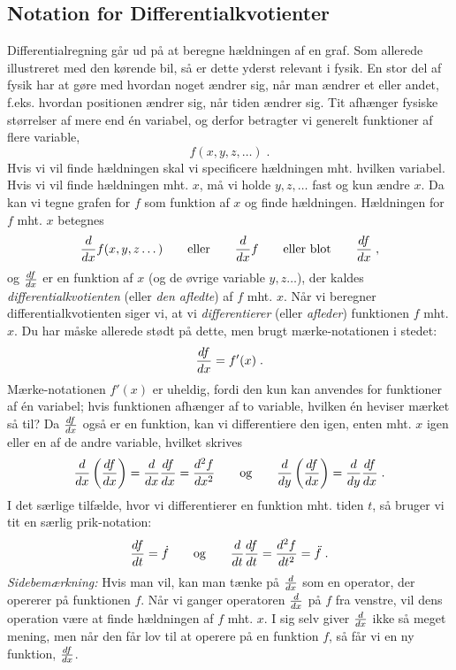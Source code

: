 \subsection{Notation for Differentialkvotienter}
Differentialregning går ud på at beregne hældningen af en graf. Som
allerede illustreret med den kørende bil, så er dette yderst relevant
i fysik. En stor del af fysik har at gøre med hvordan noget ændrer
sig, når man ændrer et eller andet, f.eks. hvordan positionen ændrer
sig, når tiden ændrer sig. Tit afhænger fysiske størrelser af mere end
én variabel, og derfor betragter vi generelt funktioner af flere
variable,
\[
f(x,y,z,\dots) \; .
\]
Hvis vi vil finde hældningen skal vi specificere hældningen
mht. hvilken variabel. Hvis vi vil finde hældningen mht. $x$, må vi
holde $y, z, \dots$ fast og kun ændre $x$. Da kan vi tegne grafen for
$f$ som funktion af $x$ og finde hældningen. Hældningen for $f$
mht. $x$ betegnes
\begin{align*}
  \dl{f(x,y,z\dots)}{x}
  \qquad
  \text{eller}
  \qquad
  \dl{f}{x}
  \qquad
  \text{eller blot}
  \qquad
  \d{f}{x} \; ,
\end{align*}
og $\d{f}{x}$ er en funktion af $x$ (og de øvrige variable
$y,z\dots$), der kaldes \emph{differentialkvotienten} (eller \emph{den
  afledte}) af $f$ mht. $x$. Når vi beregner differentialkvotienten
siger vi, at vi \emph{differentierer} (eller \emph{afleder})
funktionen $f$ mht. $x$. Du har måske allerede stødt på dette, men
brugt mærke-notationen i stedet:
\begin{align*}
  \d{f}{x} = f'(x) \; .
\end{align*}
Mærke-notationen $f'(x)$ er uheldig, fordi den kun kan anvendes for
funktioner af én variabel; hvis funktionen afhænger af to variable,
hvilken én heviser mærket så til? Da $\d{f}{x}$ også er en funktion,
kan vi differentiere den igen, enten mht. $x$ igen eller en af de
andre variable, hvilket skrives
\begin{align*}
  \dl{\left(\d{f}{x}\right)}{x}
  = \dl{\d{f}{x}}{x}
  = \dd{f}{x}
  \qquad
  \text{og}
  \qquad
  \dl{\left(\d{f}{x}\right)}{y} = \dl{\d{f}{x}}{y} \; .
\end{align*}
I det særlige tilfælde, hvor vi differentierer en funktion mht. tiden
$t$, så bruger vi tit en særlig prik-notation:
\begin{align*}
  \d{f}{t} = \dt{f}
  \qquad
  \text{og}
  \qquad
  \dl{\d{f}{t}}{t} = \dd{f}{t} = \ddt{f} \; .
\end{align*}
\textsl{Sidebemærkning:} Hvis man vil, kan man tænke på $\d{}{x}$ som
en operator, der opererer på funktionen $f$. Når vi ganger operatoren
$\d{}{x}$ på $f$ fra venstre, vil dens operation være at finde
hældningen af $f$ mht. $x$. I sig selv giver $\d{}{x}$ ikke så meget
mening, men når den får lov til at operere på en funktion $f$, så får
vi en ny funktion, $\d{f}{x}$.

